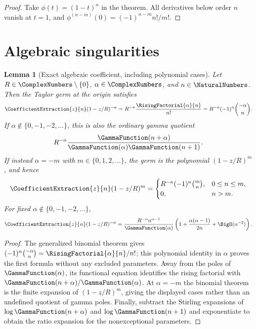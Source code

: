\documentclass[11pt,a4paper,oneside,openany]{book}
\newtheorem{lemma}[theorem]{Lemma}
\theoremstyle{definition}
\theoremstyle{remark}
\begin{document}
\begin{proof}
Take $\phi(t)=(1-t)^n$ in the theorem.  All derivatives below order $n$
vanish at $t=1$, and
$\phi^{(n-m)}(0)=(-1)^{n-m}n!/m!$.
\end{proof}

\section{Algebraic singularities}

\begin{lemma}[Exact algebraic coefficient, including polynomial cases]
\label{lem:merged-singular-binomial}
Let $R\in\ComplexNumbers\setminus\{0\}$,
$\alpha\in\ComplexNumbers$, and $n\in\NaturalNumbers$.  Then the Taylor
germ at the origin satisfies
\begin{equation}
 \CoefficientExtraction{z}{n}(1-z/R)^{-\alpha}
 =R^{-n}\frac{\RisingFactorial{\alpha}{n}}{n!}
 =R^{-n}(-1)^n\binom{-\alpha}{n}.                                  \label{eq:merged-singular-binomial}
\end{equation}
If $\alpha\notin\{0,-1,-2,\ldots\}$, this is also the ordinary gamma quotient
\begin{equation}
 R^{-n}\frac{\GammaFunction(n+\alpha)}{\GammaFunction(\alpha)\GammaFunction(n+1)}.          \label{eq:merged-singular-binomial-gamma}
\end{equation}
If instead $\alpha=-m$ with $m\in\{0,1,2,\ldots\}$, the germ is the
polynomial $(1-z/R)^m$, and hence
\begin{equation}
 \CoefficientExtraction{z}{n}(1-z/R)^m=
 \begin{cases}
  R^{-n}(-1)^n\binom mn,&0\leq n\leq m,\\
  0,&n>m.
 \end{cases}                                                        \label{eq:merged-singular-binomial-polynomial}
\end{equation}
For fixed $\alpha\notin\{0,-1,-2,\ldots\}$,
\begin{equation}
 \CoefficientExtraction{z}{n}(1-z/R)^{-\alpha}
 =\frac{R^{-n}n^{\alpha-1}}{\GammaFunction(\alpha)}
 \left(1+\frac{\alpha(\alpha-1)}{2n}+\BigO(n^{-2})\right).              \label{eq:merged-singular-binomial-asymp}
\end{equation}
\end{lemma}

\begin{proof}
The generalized binomial theorem gives
$(-1)^n\binom{-\alpha}{n}=\RisingFactorial{\alpha}{n}/n!$; this
polynomial identity in $\alpha$ proves the first formula without any excluded
parameters.  Away from the poles of $\GammaFunction(\alpha)$, its functional equation
identifies the rising factorial with
$\GammaFunction(n+\alpha)/\GammaFunction(\alpha)$.  At $\alpha=-m$ the binomial theorem is
the finite expansion of $(1-z/R)^m$, giving the displayed cases rather than an
undefined quotient of gamma poles.  Finally, subtract the Stirling expansions
of $\log\GammaFunction(n+\alpha)$ and $\log\GammaFunction(n+1)$ and exponentiate to obtain the
ratio expansion for the nonexceptional parameters.
\end{proof}
\end{document}
